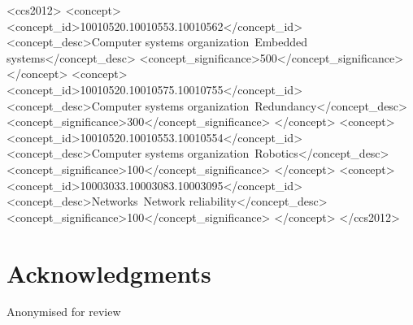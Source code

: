 \documentclass[sigconf,anonymous]{acmart}
\begin{document}
\begin{CCSXML}
<ccs2012>
 <concept>
  <concept_id>10010520.10010553.10010562</concept_id>
  <concept_desc>Computer systems organization~Embedded systems</concept_desc>
  <concept_significance>500</concept_significance>
 </concept>
 <concept>
  <concept_id>10010520.10010575.10010755</concept_id>
  <concept_desc>Computer systems organization~Redundancy</concept_desc>
  <concept_significance>300</concept_significance>
 </concept>
 <concept>
  <concept_id>10010520.10010553.10010554</concept_id>
  <concept_desc>Computer systems organization~Robotics</concept_desc>
  <concept_significance>100</concept_significance>
 </concept>
 <concept>
  <concept_id>10003033.10003083.10003095</concept_id>
  <concept_desc>Networks~Network reliability</concept_desc>
  <concept_significance>100</concept_significance>
 </concept>
</ccs2012>
\end{CCSXML}




\maketitle









\section{Acknowledgments}
\begin{acks}
Anonymised for review
\end{acks}



\end{document}
